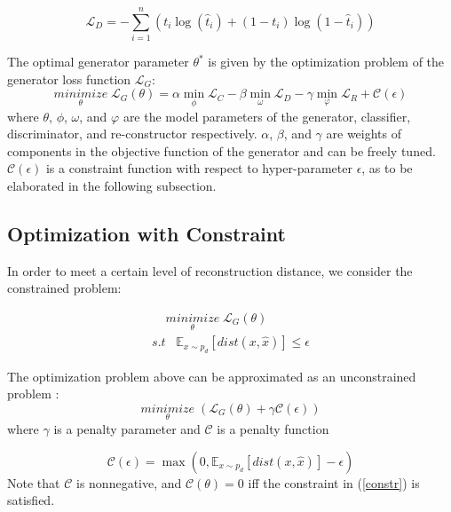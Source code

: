 \begin{equation}
\mathcal{L}_D = -\sum_{i=1}^n{(t_i\log(\hat t_i) + (1 - t_i)\log(1 - \hat t_i))} 
\label{D_loss}
\end{equation}

The optimal generator parameter $\theta^*$ is given by the optimization problem of the generator loss function  $\mathcal{L}_G$:
\begin{equation}
\underset{\theta}{minimize} \; \mathcal{L}_G(\theta) = \alpha \min\limits_{\phi}{\mathcal{L}_C} - \beta\min\limits_{\omega}{\mathcal{L}_D}
 -\gamma\min\limits_{\varphi}{\mathcal{L}_R} + \mathcal{C}(\epsilon)
 \label{eqn:G_loss}
\end{equation}  
where $\theta$, $\phi$, $\omega$, and $\varphi$ are the model parameters of the generator, classifier, discriminator, and re-constructor respectively. $\alpha$, $\beta$, and $\gamma$ are weights of components in the objective function of the generator and can be freely tuned. $\mathcal{C}(\epsilon)$ is a constraint function with respect to hyper-parameter $\epsilon$, as to be elaborated in the following subsection.

\subsection{Optimization with Constraint}
In order to meet a certain level of reconstruction distance, we consider the constrained problem:

\begin{equation}
\begin{array}{l}
\; \; \; \;\underset{\theta}{minimize} \;\mathcal{L}_G(\theta) \\ 
s.t \; \; \;  \mathbb{E}_{x \sim p_d}[dist(x, \hat{x})] \leq \epsilon  
\end{array}
\label{constr}
\end{equation}

The optimization problem above can be approximated as an unconstrained problem \cite{pauljensen}:
\begin{equation} 
\underset{\theta}{minimize} \; ( \mathcal{L}_G(\theta) + \gamma \mathcal{C}(\epsilon) )  
\end{equation}
 where $\gamma$ is a penalty parameter and $\mathcal{C}$ is a penalty function 

\begin{equation} 
\mathcal{C}(\epsilon) = \max(0, \mathbb{E}_{x \sim p_d}[dist(x, \hat{x})] -\epsilon)
\end{equation}
Note that $\mathcal{C}$ is nonnegative, and $\mathcal{C}(\theta)=0$ iff the constraint in (\ref{constr}) is satisfied.


